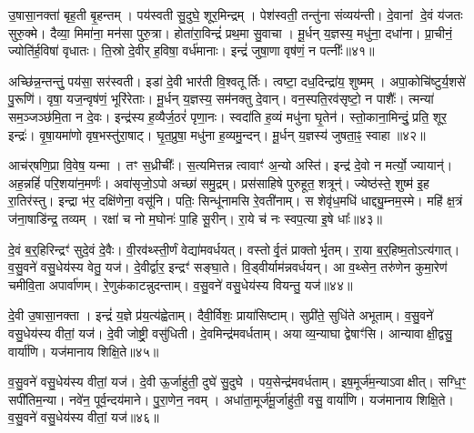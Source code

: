 उ॒षासा॒नक्ता॑ बृह॒ती बृ॒हन्तम्।
पय॑स्वती सु॒दुघे॒ शूर॒मिन्द्रम्।
पेश॑स्वती॒ तन्तु॑ना संव्यय॑न्ती।
दे॒वानां दे॒वं य॑जतः सुरु॒क्मे।
दैव्या॒ मिमा॑ना॒ मन॑सा पुरु॒त्रा।
होता॑रा॒विन्द्रं॑ प्रथ॒मा सु॒वाचा।
मू॒र्धन् य॒ज्ञस्य॒ मधु॑ना॒ दधा॑ना।
प्रा॒चीनं॒ ज्योति॑र्\mbox{}ह॒विषा॑ वृधातः।
ति॒स्रो दे॒वीर्‌\mbox{} ह॒विषा॒ वर्ध॑मानाः।
इन्द्रं॑ जुषा॒णा वृष॑णं॒ न पत्नीः᳚॥४१॥

अच्छि॑न्न॒न्तन्तुं॒ पय॑सा॒ सर॑स्वती।
इडा॑ दे॒वी भार॑ती वि॒श्वतूर्तिः।
त्वष्टा॒ दध॒दिन्द्रा॑य॒ शुष्मम्।
अपा॒कोचि॑ष्टुर्य॒शसे॑ पु॒रूणि॑।
वृषा॒ यज॒न्वृष॑णं॒ भूरि॑रेताः।
मू॒र्धन् य॒ज्ञस्य॒ सम॑नक्तु दे॒वान्।
वन॒स्पति॒रव॑सृष्टो॒ न पाशैः᳚।
त्मन्या॑ सम॒ञ्जञ्छ॑मि॒ता न दे॒वः।
इन्द्र॑स्य ह॒व्यैर्ज॒ठरं॑ पृणा॒नः।
स्वदा॑ति ह॒व्यं मधु॑ना घृ॒तेन॑।
स्तो॒काना॒मिन्दुं॒ प्रति॒ शूर॒ इन्द्रः॑।
वृ॒षा॒यमा॑णो वृष॒भस्तु॑रा॒षाट्।
घृ॒त॒प्रुषा॒ मधु॑ना ह॒व्यमु॒न्दन्।
मू॒र्धन् य॒ज्ञस्य॑ जुषता॒ꣴ॒ स्वाहा॥४२॥\anuvakamend[शर्ध॑मानो॒ महो॑भिः॒ पत्नीर्घृ॒तेन॑ च॒त्वारि॑ च]

आच॑र्‌\mbox{}षणि॒प्रा वि॒वेष॒ यन्मा।
तꣳ स॒ध्रीचीः᳚।
स॒त्यमित्तन्न त्वावाꣳ॑ अ॒न्यो अस्ति॑।
इन्द्र॑ दे॒वो न मर्त्यो॒ ज्यायान्॑।
अह॒न्नहिं॑ परि॒शया॑न॒मर्णः॑।
अवा॑सृजो॒ऽपो अच्छा॑ समु॒द्रम्।
प्रस॑साहिषे पुरुहूत॒ शत्रून्॑।
ज्येष्ठ॑स्ते॒ शुष्म॑ इ॒ह रा॒तिर॑स्तु।
इन्द्रा भ॑र॒ दक्षि॑णेना॒ वसू॑नि।
पतिः॒ सिन्धू॑नामसि रे॒वती॑नाम्।
स शेवृ॑ध॒मधि॑ धाद्द्यु॒म्नम॒स्मे।
महि॑ क्ष॒त्रं ज॑ना॒षाडि॑न्द्र॒ तव्यम्।
रक्षा॑ च नो म॒घोनः॑ पा॒हि सू॒रीन्।
रा॒ये च॑ नः स्वप॒त्या इ॒षे धाः᳚॥४३॥\anuvakamend[रे॒वती॑नां च॒त्वारि॑ च]

दे॒वं ब॒र्॒हिरिन्द्रꣳ॑ सुदे॒वं दे॒वैः।
वी॒रव॑थ्स्ती॒र्णं वेद्या॑मवर्धयत्।
वस्तोर्वृ॒तं प्राक्तोर्भृ॒तम्।
रा॒या ब॒र्॒हिष्म॒तो\-ऽत्य॑गात्।
व॒सु॒वने॑ वसु॒धेय॑स्य वेतु॒ यज॑।
दे॒वीर्द्वार॒ इन्द्रꣳ॑ सङ्घा॒ते।
वि॒ड्वीर्याम॑न्नवर्धयन्।
आ व॒थ्सेन॒ तरु॑णेन कुमा॒रेण॑ चमीवि॒ता अपार्वा॑णम्।
रे॒णुक॑काटन्नुदन्ताम्।
व॒सु॒वने॑ वसु॒धेय॑स्य वियन्तु॒ यज॑॥४४॥

दे॒वी उ॒षासा॒नक्ता।
इन्द्रं॑ य॒ज्ञे प्र॑य॒त्य॑ह्वेताम्।
दैवी॒र्विशः॒ प्राया॑सिष्टाम्।
सुप्री॑ते॒ सुधि॑ते अभूताम्।
व॒सु॒वने॑ वसु॒धेय॑स्य वीतां॒ यज॑।
दे॒वी जोष्ट्री॒ वसु॑धिती।
दे॒वमिन्द्र॑मवर्धताम्।
अयाव्य॒न्याघा द्वेषाꣳ॑सि।
आन्यावाक्षी॒द्वसु॒ वार्या॑णि।
यज॑मानाय शिक्षि॒ते॥४५॥

व॒सु॒वने॑ वसु॒धेय॑स्य वीतां॒ यज॑।
दे॒वी ऊ॒र्जाहु॑ती॒ दुघे॑ सु॒दुघे।
पय॒सेन्द्र॑मवर्धताम्।
इष॒मूर्ज॑म॒न्या\-ऽवाक्षीत्।
सग्धि॒ꣳ॒ सपी॑तिम॒न्या।
नवे॑न॒ पूर्व॒न्दय॑माने।
पु॒रा॒णेन॒ नवम्।
अधा॑ता॒मूर्ज॑मू॒र्जाहु॑ती॒ वसु॒ वार्या॑णि।
यज॑मानाय शिक्षि॒ते।
व॒सु॒वने॑ वसु॒धेय॑स्य वीतां॒ यज॑॥४६॥

